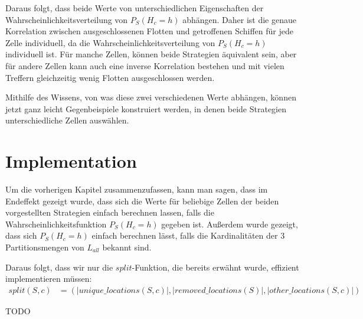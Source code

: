 \documentclass[a4paper,12pt]{llncs}
\numberwithin{equation}{section}
\begin{document}
Daraus folgt, dass beide Werte von unterschiedlichen Eigenschaften der Wahrscheinlichkeitsverteilung von $P_S(H_{c} = h)$ abhängen. Daher ist die genaue Korrelation zwischen ausgeschlossenen Flotten und getroffenen Schiffen für jede Zelle individuell, da die Wahrscheinlichkeitsverteilung von $P_S(H_{c} = h)$ individuell ist. Für manche Zellen, können beide Strategien äquivalent sein, aber für andere Zellen kann auch eine inverse Korrelation bestehen und mit vielen Treffern gleichzeitig wenig Flotten ausgeschlossen werden.

Mithilfe des Wissens, von was diese zwei verschiedenen Werte abhängen, können jetzt ganz leicht Gegenbeispiele konstruiert werden, in denen beide Strategien unterschiedliche Zellen auswählen.

\section{Implementation}

Um die vorherigen Kapitel zusammenzufassen, kann man sagen, dass im Endeffekt gezeigt wurde, dass sich die Werte für beliebige Zellen der beiden vorgestellten Strategien einfach berechnen lassen, falls die Wahrscheinlichkeitsfunktion $P_S(H_{c} = h)$ gegeben ist. Außerdem wurde gezeigt, dass sich $P_S(H_{c} = h)$ einfach berechnen lässt, falls die Kardinalitäten der 3 Partitionsmengen von $L_{all}$ bekannt sind.

Daraus folgt, dass wir nur die $split$-Funktion, die bereits erwähnt wurde, effizient implementieren müssen:
\begin{align}
split(S,c)&=(|unique\_locations(S, c)|, |removed\_locations(S)|, |other\_locations(S, c)|)
\nonumber
\end{align}

TODO


\newpage

 

\end{document}
